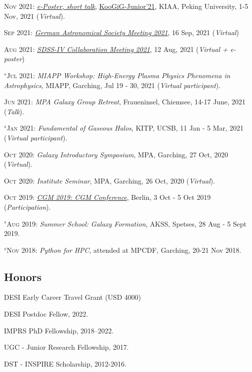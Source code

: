 \documentclass[12pt,letterpaper]{article}
\newcommand{\as}{$^{s}$}
\begin{document}
\begin{list}{}{\cvlist}
\item \textsc{Nov} 2021:   \textit{\href{https://www.bilibili.com/video/BV1nv411M7w3}{e-Poster, short talk}}, \href{https://kiaa.pku.edu.cn/KooGig_junior21/Home.htm}{KooGiG-Junior'21}, KIAA, Peking University, 1-5 Nov, 2021 (\textit{Virtual}).   

\item \textsc{Sep} 2021:  \emph{\href{https://ag2021.astronomische-gesellschaft.de/view_splinter.php?session=Stars}{German Astronomical Society Meeting 2021}}, 16 Sep, 2021 (\textit{Virtual})   
\item \textsc{Aug} 2021:  \emph{\href{https://jhu2021.sdss.org/}{SDSS-IV Collaboration Meeting 2021}}, 12 Aug, 2021 (\textit{Virtual + e-poster})   
\item \textsc{\as Jul} 2021:  \emph{MIAPP Workshop: High-Energy Plasma Physics Phenomena in Astrophysics}, MIAPP, Garching, Jul 19 - 30, 2021 (\textit{Virtual participant}).  

\item \textsc{Jun} 2021:  \emph{MPA Galaxy Group Retreat}, Fraueninsel, Chiemsee, 14-17 June, 2021 (\textit{Talk}).  
\item \textsc{\as Jan} 2021:  \emph{Fundamental of Gaseous Halos}, KITP, UCSB, 11 Jan - 5 Mar, 2021 (\textit{Virtual participant}).  
\item \textsc{Oct} 2020:  \emph{Galaxy Introductory Symposium}, MPA, Garching, 27 Oct, 2020 (\textit{Virtual}).  
\item \textsc{Oct} 2020:  \emph{Institute Seminar}, MPA, Garching, 26 Oct, 2020 (\textit{Virtual}).  

\item \textsc{Oct} 2019:  \emph{\href{https://wwwmpa.mpa-garching.mpg.de/conf/berlincgm2019/}{CGM 2019: CGM Conference}}, Berlin, 3 Oct - 5 Oct 2019 (\textit{Participation}).  
\item \textsc{\as Aug} 2019:  \emph{Summer School: Galaxy Formation}, AKSS, Spetses, 28 Aug - 5 Sept 2019.  
\item \textsc{\as Nov} 2018:  \emph{Python for HPC}, attended at MPCDF, Garching, 20-21 Nov 2018.  

\end{list}

\subsection{Honors}
\begin{list}{}{\cvlist}
  \item DESI Early Career Travel Grant (USD 4000)
  \item DESI Postdoc Fellow, 2022.
  \item IMPRS PhD Fellowship, 2018--2022.
  \item UGC - Junior Research Fellowship, 2017.
  \item DST - INSPIRE Scholarship, 2012-2016.

\end{list}
\end{document}
